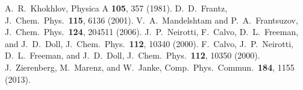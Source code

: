 A.~R.\ Khokhlov, Physica A \textbf{105}, 357 (1981).
%
D.~D.\ Frantz, J.~Chem.\ Phys.\ \textbf{115}, 
6136 (2001).
%
V.~A.\ Mandelshtam and P.~A.\ Frantsuzov, J.~Chem.\ Phys.\ \textbf{124}, 
204511 (2006).
%
%
J.~P.\ Neirotti, F.~Calvo, D.~L.\ Freeman, and J.~D.\ Doll, J.~Chem.\ Phys.\ 
\textbf{112}, 10340 (2000).
%
F.~Calvo, J.~P.\ Neirotti, D.~L.\ Freeman, and J.~D.\ Doll, J.~Chem.\ Phys.\ 
\textbf{112}, 10350 (2000).
%
%
%
J.~Zierenberg, M.~Marenz, and W.~Janke, Comp.\ Phys.\ Commun.\
\textbf{184}, 1155 (2013). 
%
%






